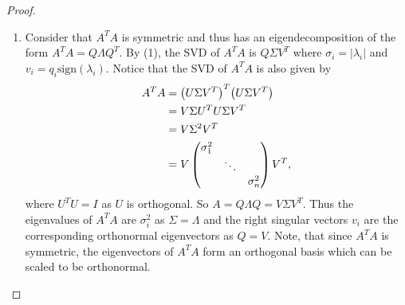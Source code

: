 \documentclass[12pt]{report}
\begin{document}
\begin{problem}
\begin{proof}
\begin{enumerate}
     \item
     Consider that $A^TA$ is symmetric and thus has an eigendecomposition of the form $A^TA = Q\Lambda Q^T$. By (1), the SVD of $A^TA$ is $Q\Sigma V^T$ where $\sigma_i = |\lambda_i|$ and $v_i = q_i \text{sign}(\lambda_i)$. Notice that the SVD of $A^TA$ is also given by
     \begin{align*}
          A^TA &= {\left(U\Sigma V^T\right)}^T{\left(U \Sigma V^T\right)}\\
               &= V\Sigma U^T U \Sigma V^T\\
               &= V \Sigma^2 V^T\\
               &= V \begin{pmatrix}
                    \sigma_1^2\\
                    &\ddots\\
                    &&\sigma_n^2
               \end{pmatrix} V^T,
     \end{align*}
     where $U^TU = I$ as $U$ is orthogonal. So $A=Q\Lambda Q = V\Sigma V^T$. Thus the eigenvalues of $A^TA$ are $\sigma_i^2$ as $\Sigma = \Lambda$ and the right singular vectors $v_i$ are the corresponding orthonormal eigenvectors as $Q=V$. Note, that since $A^TA$ is symmetric, the eigenvectors of $A^TA$ form an orthogonal basis which can be scaled to be orthonormal. 



\end{enumerate}
\end{proof}
\end{problem}
\end{document}

